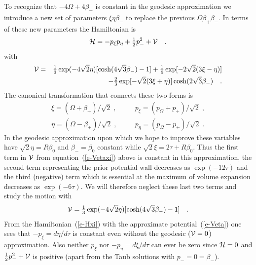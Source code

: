 To recognize that $-4\Omega + 4\beta_+$ is constant in the geodesic
approximation we introduce a new set of parameters $\xi\eta\beta_-$ to
replace the previous $\Omega\beta_+\beta_-$.  In
terms of these new parameters the Hamiltonian is
\begin{equation}\label{e-Hxi}
 {\cal H} = -p_\xi p_\eta + \mbox{$\frac{1}{2}$} p_-^2 + {\cal V} \quad .
\end{equation}
with
\begin{eqnarray}\label{e-Vetaxi}
  {\cal V} & = &  \mbox{$\frac{1}{3}$}\exp(-4\sqrt{2}\eta)
                        [\cosh(4\sqrt{3}\beta_-)-1]
                  + \mbox{$\frac{1}{6}$}\exp[-2\sqrt{2}(3\xi - \eta)]
                    \nonumber\\
           &   &  - \mbox{$\frac{2}{3}$}\exp[-\sqrt{2}(3\xi + \eta)]
                    \cosh(2\sqrt{3}\beta_-)
                        \quad .
\end{eqnarray}
The canonical transformation that connects these two forms is
\begin{eqnarray}
     \xi = (\Omega + \beta_+)/\sqrt{2}\; , & \quad &
                    p_\xi = (p_\Omega + p_+)/\sqrt{2} \; ,\nonumber\\
     \eta =(\Omega - \beta_+)/\sqrt{2}\; , & \quad &
                    p_\eta =(p_\Omega - p_+)/\sqrt{2} \; .
\end{eqnarray}
In the geodesic approximation upon which we hope to improve these
variables have $\sqrt{2}\eta=R\beta_0$ and $\beta_-=\beta_0$ constant
while $\sqrt{2}\xi =2 \tau+R\beta_0$.  Thus the first term in ${\cal
V}$ from equation~(\ref{e-Vetaxi}) above is constant in this
approximation, the second term representing the prior potential wall
decreases as $\exp(-12\tau)$ and the third (negative) term which is
essential at the maximum of volume expansion decreases as
$\exp(-6\tau)$.  We will therefore neglect these last two terms and
study the motion with
\begin{equation}\label{e-Veta}
  {\cal V} =  \mbox{$\frac{1}{3}$}\exp(-4\sqrt{2}\eta)
                        [\cosh(4\sqrt{3}\beta_-)-1]
                        \quad .
\end{equation}
{}From the Hamiltonian~(\ref{e-Hxi}) with the approximate
potential~(\ref{e-Veta}) one sees that $-p_\xi = d\eta/d\tau$ is
constant even without the geodesic (${\cal V}=0$) approximation.
Also neither $p_\xi$ nor $-p_\eta = d\xi/d\tau$ can ever be zero
since ${\cal H}= 0$ and $\mbox{$\frac{1}{2}$} p_-^2 + {\cal V}$ is positive (apart
from the Taub solutions with $p_- = 0 = \beta_-$).

